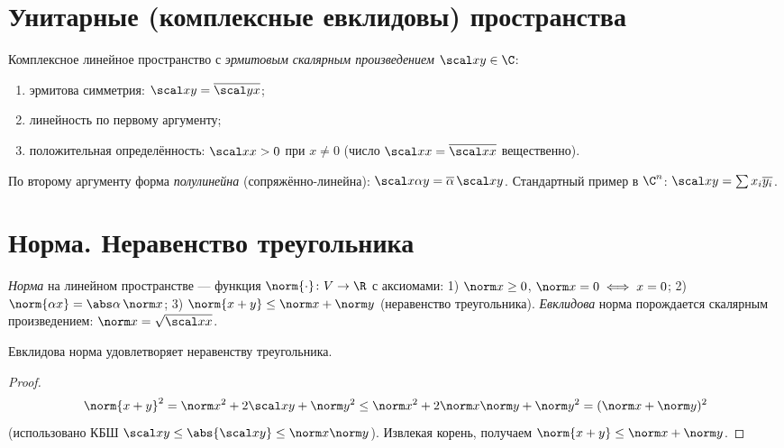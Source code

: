 \section{Унитарные (комплексные евклидовы) пространства}

\begin{definition}
Комплексное линейное пространство с \emph{эрмитовым скалярным произведением} $\scal xy\in\C$:
\begin{enumerate}[label=\arabic*),leftmargin=*,nosep]
  \item эрмитова симметрия: $\scal xy=\overline{\scal yx}$;
  \item линейность по первому аргументу;
  \item положительная определённость: $\scal xx>0$ при $x\ne0$ (число $\scal xx=\overline{\scal xx}$
        вещественно).
\end{enumerate}
\end{definition}

\begin{remark}
По второму аргументу форма \emph{полулинейна} (сопряжённо-линейна):
$\scal x{\alpha y}=\overline\alpha\,\scal xy$. Стандартный пример в $\C^n$:
$\scal xy=\sum x_i\overline{y_i}$.
\end{remark}

\section{Норма. Неравенство треугольника}

\begin{definition}
\emph{Норма} на линейном пространстве — функция $\norm{\cdot}\colon V\to\R$ с аксиомами:
1) $\norm x\ge0$, $\norm x=0\iff x=0$; 2) $\norm{\alpha x}=\abs\alpha\,\norm x$;
3) $\norm{x+y}\le\norm x+\norm y$ (неравенство треугольника).
\emph{Евклидова} норма порождается скалярным произведением: $\norm x=\sqrt{\scal xx}$.
\end{definition}

\begin{theorem}
Евклидова норма удовлетворяет неравенству треугольника.
\end{theorem}

\begin{proof}
\[
  \norm{x+y}^2=\norm x^2+2\scal xy+\norm y^2\le\norm x^2+2\norm x\norm y+\norm y^2=(\norm x+\norm y)^2
\]
(использовано КБШ $\scal xy\le\abs{\scal xy}\le\norm x\norm y$). Извлекая корень, получаем
$\norm{x+y}\le\norm x+\norm y$.
\end{proof}

